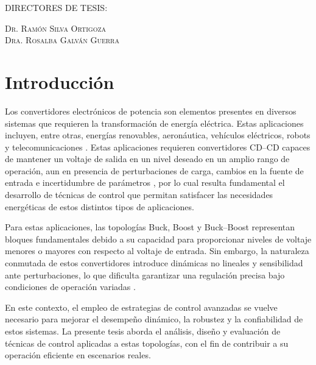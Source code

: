 \documentclass[12pt,oneside,openany]{book}
\begin{document}
\begin{center}
	\vspace*{0.75in}
	
	
	\centerline{\normalsize DIRECTORES DE TESIS:}
	\vspace*{0.125in}
	\scshape{
		Dr. Ramón Silva Ortigoza  \\
		Dra. Rosalba Galván Guerra\\
	}
	
	
	\vspace*{1in}
	
	 \vspace*{-0.25in} 
	
	
\end{center}
\newpage
\tableofcontents
\thispagestyle{empty}
\newpage



\chapter{Introducción}

Los convertidores electrónicos de potencia son elementos presentes en diversos sistemas que requieren la transformación de energía eléctrica. Estas aplicaciones incluyen, entre otras, energías renovables, aeronáutica, vehículos eléctricos, robots y telecomunicaciones \cite{ref_journal1}. Estas aplicaciones requieren convertidores CD–CD capaces de mantener un voltaje de salida en un nivel deseado en un amplio rango de operación, aun en presencia de perturbaciones de carga, cambios en la fuente de entrada e incertidumbre de parámetros \cite{ref_journal2}, por lo cual resulta fundamental el desarrollo de técnicas de control que permitan satisfacer las necesidades energéticas de estos distintos tipos de aplicaciones.

Para estas aplicaciones, las topologías Buck, Boost y Buck–Boost representan bloques fundamentales debido a su capacidad para proporcionar niveles de voltaje menores o mayores con respecto al voltaje de entrada. Sin embargo, la naturaleza conmutada de estos convertidores introduce dinámicas no lineales y sensibilidad ante perturbaciones, lo que dificulta garantizar una regulación precisa bajo condiciones de operación variadas \cite{ref_journal3, ref_journal4, ref_journal5}.

En este contexto, el empleo de estrategias de control avanzadas se vuelve necesario para mejorar el desempeño dinámico, la robustez y la confiabilidad de estos sistemas. La presente tesis aborda el análisis, diseño y evaluación de técnicas de control aplicadas a estas topologías, con el fin de contribuir a su operación eficiente en escenarios reales.
\end{document}
